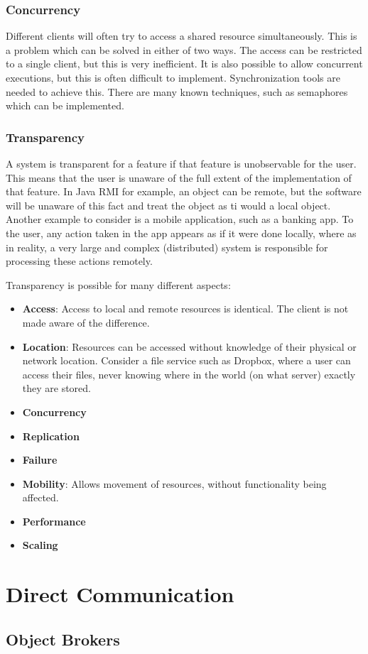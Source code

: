 \documentclass[a4paper]{article}
\begin{document}
\subsubsection{Concurrency}

Different clients will often try to access a shared resource simultaneously. This is a problem which can be solved in either of two ways. The access can be restricted to a single client, but this is very inefficient. It is also possible to allow concurrent executions, but this is often difficult to implement. Synchronization tools are needed to achieve this. There are many known techniques, such as semaphores which can be implemented.

\subsubsection{Transparency}

A system is transparent for a feature if that feature is unobservable for the user. This means that the user is unaware of the full extent of the implementation of that feature. In Java RMI for example, an object can be remote, but the software will be unaware of this fact and treat the object as ti would a local object. Another example to consider is a mobile application, such as a banking app. To the user, any action taken in the app appears as if it were done locally, where as in reality, a very large and complex (distributed) system is responsible for processing these actions remotely.

Transparency is possible for many different aspects:
\begin{itemize}
\item \textbf{Access}: Access to local and remote resources is identical. The client is not made aware of the difference.
\item \textbf{Location}: Resources can be accessed without knowledge of their physical or network location. Consider a file service such as Dropbox, where a user can access their files, never knowing where in the world (on what server) exactly they are stored.
\item \textbf{Concurrency}
\item \textbf{Replication}
\item \textbf{Failure}
\item \textbf{Mobility}: Allows movement of resources, without functionality being affected.
\item \textbf{Performance}
\item \textbf{Scaling}
\end{itemize}

\newpage

\section{Direct Communication}

\subsection{Object Brokers}
\end{document}
